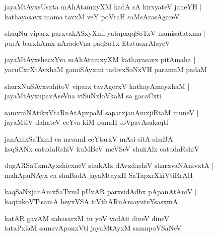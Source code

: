 \setcounter{shloka}{0}
\begin{shloka}
jayaMtAyxsUsxta mAhAtamxyXM kadA sA kirxyateV janeYH |\\
kathayasavx mama tavxM veY poVtaH saMsArasAgareV
\end{shloka}

\begin{shloka}
shuqNu viparx parxvakASxyXmi yatapxqqSoTxV munisatatxma |\\
purA barxhAmx nAradeVna paqSaTx EtatusxrAlayeV
\end{shloka}

\begin{shloka}
jayaMtAyxshecxYva mAhAtamxyXM kathayasavx pitAmaha |\\
yacuCxrXtAvxhaM gamiSAyxmi tadivxSoNxVH paramaM padaM
\end{shloka}

\begin{shloka}
shurxNuSAvxvahitoV viparx tavAgerxV kathayAmayxhaM |\\
jayaMtAyxupavAseVna viSuNxloVkaM sa gacaCxti
\end{shloka}

\begin{shloka}
samxraNAtikxVtaRnAtApxpaM sapatxjanAmxjiRtaM muneV |\\
jayaMtiV dahateV ceYva kiM punaH soVpavAsakaqtf
\end{shloka}

\begin{shloka}
janAmxSaTxmI ca navamI ceYtarxV mAsi sitA shuBA\\
ksqSANx catudaRshiV kuMBeV meVSeV shukAlx catudaRshiV
\end{shloka}

\begin{shloka}
dugARSaTxmAyxshicxneV shukAlx dAvxdashiV sharxvaNAnivxtA |\\
mahApuNAyx ca shuBadA jayaMtayxH SaTapxrXkiVtiRrAH
\end{shloka}

\begin{shloka}
kaqSaNxjanAmxSaTxmI pUvAR parxsidAdhx pApanAtAniV |\\
kaqtukoVTisamA heyxVSA tiVthARnAmayuteYsasxmA
\end{shloka}

\begin{shloka}
katAR gavAM sahasarxM tu yoV vadAti dineV dineV\\
tataPxlaM samavAponxVti jayaMtAyxM samupoVSaNeV
\end{shloka}

